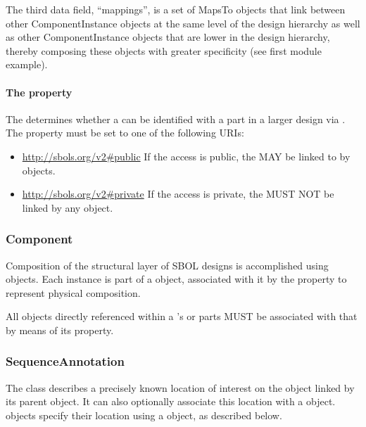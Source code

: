 The third data field, ``mappings'', is a set of MapsTo objects that link between other ComponentInstance objects at the same level of the design hierarchy as well as other ComponentInstance objects that are lower in the design hierarchy, thereby composing these objects with greater specificity (see first module example).

\paragraph{The  property}
\label{sec:access}

The  determines whether a  
can be identified with a part in a larger design via .
The  property must be set to one of the following URIs:

\begin{itemize}
\item \url{http://sbols.org/v2#public}
  If the access is public, the  MAY be linked to by  objects.

\item \url{http://sbols.org/v2#private}
  If the access is private, the  MUST NOT be linked by any  object.
\end{itemize}


\subsubsection{Component}
\label{sec:Component}
Composition of the structural layer of SBOL designs is accomplished using  objects. Each  instance is part of a  object, associated with it by the  property to represent  physical composition.  

All  objects directly referenced within a 's  or  parts MUST be associated with that  by means of its  property.


\subsubsection{SequenceAnnotation}
\label{sec:SequenceAnnotation}
The  class describes a precisely known location of interest on the  object linked by its parent  object.  It can also optionally associate this location with a  object.  objects specify their location using a  object, as described below.


